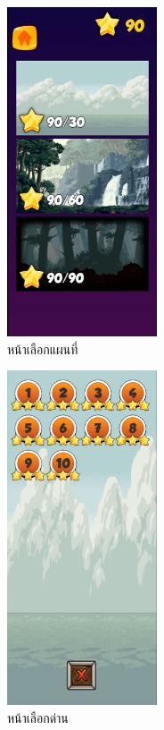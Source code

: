 \begin{figure}[h!]
\begin{center}
\includegraphics[width=1.75in]{pic/MapSelection.png}
\end{center}
\caption[หน้าเลือกแผนที่]{หน้าเลือกแผนที่}
\label{map}
\end{figure}

\begin{figure}[h!]
\begin{center}
\includegraphics[width=1.75in]{pic/LevelSelection1.png}
\end{center}
\caption[หน้าเลือกด่าน]{หน้าเลือกด่าน}
\label{stage}
\end{figure}


